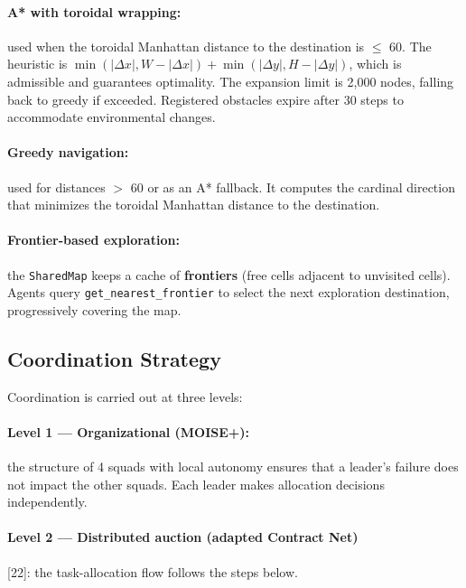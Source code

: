 \documentclass[11pt,a4paper]{article}
\newcommand{\code}[1]{\texttt{#1}}
\begin{document}
\paragraph{A* with toroidal wrapping:} used when the toroidal Manhattan distance to the destination is $\le$ 60. The heuristic is $\min(|\Delta x|, W-|\Delta x|) + \min(|\Delta y|, H-|\Delta y|)$, which is admissible and guarantees optimality. The expansion limit is 2{,}000 nodes, falling back to greedy if exceeded. Registered obstacles expire after 30 steps to accommodate environmental changes.

\paragraph{Greedy navigation:} used for distances $>$ 60 or as an A* fallback. It computes the cardinal direction that minimizes the toroidal Manhattan distance to the destination.

\paragraph{Frontier-based exploration:} the \code{SharedMap} keeps a cache of \textbf{frontiers} (free cells adjacent to unvisited cells). Agents query \code{get\_nearest\_frontier} to select the next exploration destination, progressively covering the map.

\subsection{Coordination Strategy}
Coordination is carried out at three levels:

\paragraph{Level 1 --- Organizational (MOISE+):} the structure of 4 squads with local autonomy ensures that a leader's failure does not impact the other squads. Each leader makes allocation decisions independently.

\paragraph{Level 2 --- Distributed auction (adapted Contract Net)} [22]: the task-allocation flow follows the steps below.
\end{document}
